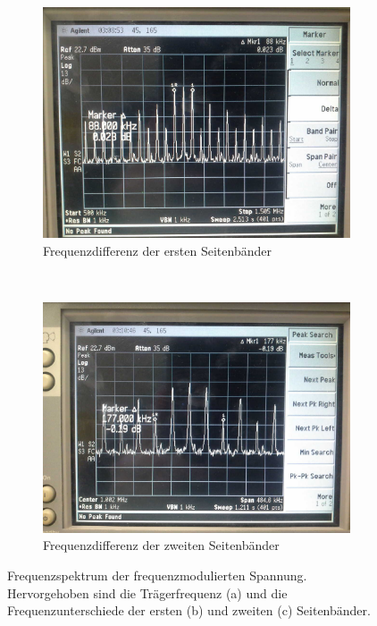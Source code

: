 \begin{figure}[!h]
	\begin{subfigure}[t]{0.5\textwidth}
		\centering
		\includegraphics[scale=0.17]{../Grafiken/Frequenzspektrum_d_FreqModuliert_1.jpg}
		\caption{Frequenzdifferenz der ersten Seitenbänder\label{fig:frequenzspektrum_d_freqmoduliert_1}}
	\end{subfigure}%
	~
	\begin{subfigure}[t]{0.5\textwidth}
		\centering
		\includegraphics[scale=0.17]{../Grafiken/Frequenzspektrum_d_FreqModuliert_2.jpg}
		\caption{Frequenzdifferenz der zweiten Seitenbänder\label{fig:frequenzspektrum_d_freqmoduliert_2}}
	\end{subfigure}
	\caption{Frequenzspektrum der frequenzmodulierten Spannung. Hervorgehoben sind die Trägerfrequenz (a)
		und die Frequenzunterschiede der ersten (b)  und zweiten (c) Seitenbänder. 
		\label{fig:frequenzspektrum_d_freqmoduliert}}
\end{figure}
\FloatBarrier